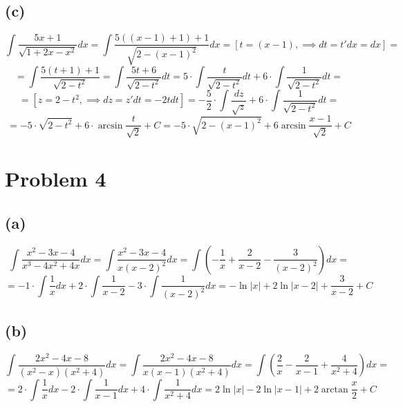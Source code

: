 \documentclass{article}
\begin{document}
\subsection*{(c)}
$$\int\frac{5x + 1}{\sqrt{1 + 2x - x^2}}dx = \int\frac{5((x - 1) + 1) + 1}{\sqrt{2 - (x - 1)^2}}dx = [t = (x - 1),\implies dt = t'dx = dx] = $$
$$ = \int\frac{5(t + 1) + 1}{\sqrt{2 - t^2}} = \int\frac{5t + 6}{\sqrt{2 - t^2}}dt = 5\cdot\int\frac{t}{\sqrt{2 - t^2}}dt + 6\cdot\int\frac{1}{\sqrt{2 - t^2}}dt = $$
$$ = [z = 2 - t^2,\implies dz = z'dt = -2tdt] = -\frac{5}{2}\cdot\int\frac{dz}{\sqrt{z}} + 6\cdot\int\frac{1}{\sqrt{2 - t^2}}dt = $$
$$ = -5\cdot\sqrt{2 - t^2} + 6\cdot\arcsin{\frac{t}{\sqrt{2}}} + C = -5\cdot\sqrt{2 - (x - 1)^2} + 6\arcsin{\frac{x - 1}{\sqrt{2}}} + C$$
\section*{Problem 4}
\subsection*{(a)}
$$\int\frac{x^2 - 3x - 4}{x^3 - 4x^2 + 4x}dx = \int\frac{x^2 - 3x - 4}{x(x - 2)^2}dx = \int\left(-\frac{1}{x} + \frac{2}{x - 2} - \frac{3}{(x - 2)^2}\right)dx = $$
$$ = -1\cdot\int\frac{1}{x}dx + 2\cdot\int\frac{1}{x - 2} - 3\cdot\int\frac{1}{(x - 2)^2}dx = -\ln{|x|} + 2\ln{|x - 2|} + \frac{3}{x - 2} + C$$
\subsection*{(b)}
$$\int\frac{2x^2 - 4x - 8}{(x^2 - x)(x^2 + 4)}dx = \int\frac{2x^2 - 4x - 8}{x(x - 1)(x^2 + 4)}dx = \int\left(\frac{2}{x} - \frac{2}{x - 1} + \frac{4}{x^2 + 4}\right)dx = $$
$$ = 2\cdot\int\frac{1}{x}dx - 2\cdot\int\frac{1}{x - 1}dx + 4\cdot\int\frac{1}{x^2 + 4}dx = 2\ln{|x|} - 2\ln{|x - 1|} + 2\arctan{\frac{x}{2}} + C$$
\end{document}
